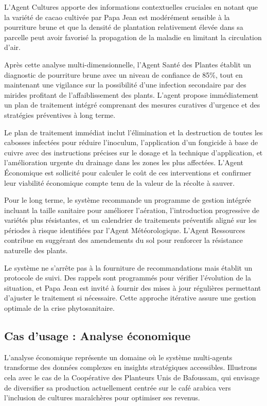 L'Agent Cultures apporte des informations contextuelles cruciales en notant que la variété de cacao cultivée par Papa Jean est modérément sensible à la pourriture brune et que la densité de plantation relativement élevée dans sa parcelle peut avoir favorisé la propagation de la maladie en limitant la circulation d'air.

Après cette analyse multi-dimensionnelle, l'Agent Santé des Plantes établit un diagnostic de pourriture brune avec un niveau de confiance de 85\%, tout en maintenant une vigilance sur la possibilité d'une infection secondaire par des mirides profitant de l'affaiblissement des plants. L'agent propose immédiatement un plan de traitement intégré comprenant des mesures curatives d'urgence et des stratégies préventives à long terme.

Le plan de traitement immédiat inclut l'élimination et la destruction de toutes les cabosses infectées pour réduire l'inoculum, l'application d'un fongicide à base de cuivre avec des instructions précises sur le dosage et la technique d'application, et l'amélioration urgente du drainage dans les zones les plus affectées. L'Agent Économique est sollicité pour calculer le coût de ces interventions et confirmer leur viabilité économique compte tenu de la valeur de la récolte à sauver.

Pour le long terme, le système recommande un programme de gestion intégrée incluant la taille sanitaire pour améliorer l'aération, l'introduction progressive de variétés plus résistantes, et un calendrier de traitements préventifs aligné sur les périodes à risque identifiées par l'Agent Météorologique. L'Agent Ressources contribue en suggérant des amendements du sol pour renforcer la résistance naturelle des plants.

Le système ne s'arrête pas à la fourniture de recommandations mais établit un protocole de suivi. Des rappels sont programmés pour vérifier l'évolution de la situation, et Papa Jean est invité à fournir des mises à jour régulières permettant d'ajuster le traitement si nécessaire. Cette approche itérative assure une gestion optimale de la crise phytosanitaire.

\subsection{Cas d'usage : Analyse économique}

L'analyse économique représente un domaine où le système multi-agents transforme des données complexes en insights stratégiques accessibles. Illustrons cela avec le cas de la Coopérative des Planteurs Unis de Bafoussam, qui envisage de diversifier sa production actuellement centrée sur le café arabica vers l'inclusion de cultures maraîchères pour optimiser ses revenus.

